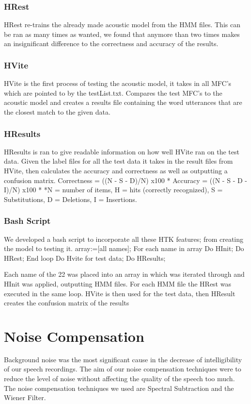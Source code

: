 \documentclass[	DIV=calc,%
							paper=a4,%
							fontsize=9.8pt,%
							twocolumn]{scrartcl}	 					%
\begin{document}
\subsubsection{HRest}
HRest re-trains the already made acoustic model from the HMM files. This can be ran as many times as wanted, we found that anymore than two times makes an insignificant difference to the correctness and accuracy of the results.
\subsubsection{HVite}
HVite is the first process of testing the acoustic model, it takes in all  MFC’s which are pointed to by the testList.txt. Compares the test MFC’s to the acoustic model and creates a results file containing the word utterances that are the closest match to the given data.


\subsubsection{HResults}
HResults is ran to give readable information on how well HVite ran on the test data. Given the label files for all the test data it takes in the result files from HVite, then  calculates the accuracy and correctness as well as outputting a confusion matrix.
Correctness = ((N - S - D)/N) x100     *
Accuracy = ((N - S - D - I)/N) x100    *
*N = number of items, H = hits (correctly recognized), S = Substitutions, D  = Deletions, I = Insertions. 

\subsubsection{Bash Script}
We developed a bash script to incorporate all these HTK features; from creating the model to testing it.
array:=[all names];
For each name in array
Do HInit;
Do HRest;
End loop
Do Hvite for test data;
Do HResults;

Each name of the 22 was placed into an array in which was iterated through and HInit was applied, outputting HMM files. For each HMM file the HRest was executed in the same loop. HVite is then used for the test data, then HResult creates the confusion matrix of the results

\section{Noise Compensation}
Background noise  was the most significant cause in the decrease of intelligibility of our speech recordings. The aim of our noise compensation techniques were to reduce the level of noise without affecting the quality of the speech too much. The noise compensation techniques we used are Spectral Subtraction and the Wiener Filter.
\end{document}
